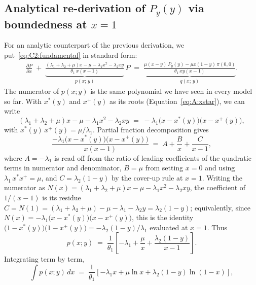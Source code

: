 \subsection{Analytical re-derivation of $P_y(y)$ via boundedness at $x=1$}\label{ssec:C2:anal}

For an analytic counterpart of the previous derivation, we put~\eqref{eq:C2:fundamental} in standard form:
\begin{align}
    \frac{\partial P}{\partial x} \;+\; \underbrace{\frac{(\lambda_1+\lambda_2+\mu)x - \mu - \lambda_1 x^2 - \lambda_2 xy}{\theta_1\,x(x-1)}}_{p(x;\,y)}\,P
    \;=\; \underbrace{\frac{\mu(x-y)\,P_y(y) - \mu x(1-y)\,\pi(0,0)}{\theta_1\,xy(x-1)}}_{q(x;\,y)}.
    \label{eq:C2:ODE_standard}
\end{align}
The numerator of $p(x;y)$ is the same polynomial we have seen in every model so far. With $x^*(y)$ and $x^+(y)$ as its roots (Equation~\eqref{eq:A:xstar}), we can write
\begin{equation}
    (\lambda_1+\lambda_2+\mu)x - \mu - \lambda_1 x^2 - \lambda_2 xy \;=\; -\lambda_1\bigl(x-x^*(y)\bigr)\bigl(x-x^+(y)\bigr),
\end{equation}
with $x^*(y)\,x^+(y) = \mu/\lambda_1$. Partial fraction decomposition gives
\begin{equation}
    \frac{-\lambda_1\bigl(x-x^*(y)\bigr)\bigl(x-x^+(y)\bigr)}{x(x-1)} \;=\; A + \frac{B}{x} + \frac{C}{x-1},
\end{equation}
where $A=-\lambda_1$ is read off from the ratio of leading coefficients of the quadratic terms in numerator and denominator, $B=\mu$ from setting $x=0$ and using $\lambda_1\,x^*x^+=\mu$, and $C=\lambda_2(1-y)$ by the cover-up rule at $x=1$. Writing the numerator as $N(x)=(\lambda_1+\lambda_2+\mu)x-\mu-\lambda_1 x^2-\lambda_2 xy$, the coefficient of $1/(x-1)$ is its residue $C=N(1)=(\lambda_1+\lambda_2+\mu)-\mu-\lambda_1-\lambda_2 y=\lambda_2(1-y)$; equivalently, since $N(x)=-\lambda_1\bigl(x-x^*(y)\bigr)\bigl(x-x^+(y)\bigr)$, this is the identity $\bigl(1-x^*(y)\bigr)\bigl(1-x^+(y)\bigr)=-\lambda_2(1-y)/\lambda_1$ evaluated at $x=1$. Thus
\begin{equation}
    p(x;y) \;=\; \frac{1}{\theta_1}\!\left[-\lambda_1 + \frac{\mu}{x} + \frac{\lambda_2(1-y)}{x-1}\right].
    \label{eq:C2:pfd}
\end{equation}
Integrating term by term,
\begin{equation}
    \int p(x;y)\,dx \;=\; \frac{1}{\theta_1}\!\left[-\lambda_1 x + \mu\ln x + \lambda_2(1-y)\ln(1-x)\right],
\end{equation}
